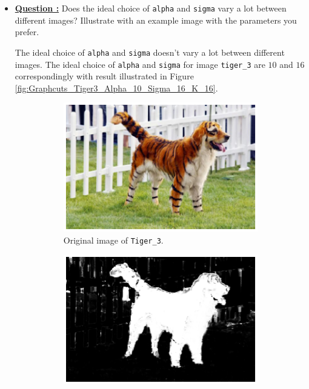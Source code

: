\documentclass[11pt,a4paper]{article}
\begin{document}
\begin{itemize}
	\item\addtocounter{Counter}{1}\underline{\textbf{Question :}} Does the ideal choice of \texttt{alpha} and \texttt{sigma} vary a lot between different images? Illustrate with an example image with the parameters you prefer.
		\par The ideal choice of \texttt{alpha} and \texttt{sigma} doesn't vary a lot between different images. The ideal choice of \texttt{alpha} and \texttt{sigma} for image \texttt{tiger\_3} are $10$ and $16$ correspondingly with result illustrated in Figure \ref{fig:Graphcuts_Tiger3_Alpha_10_Sigma_16_K_16}.
		\begin{figure}[!ht]
			\footnotesize
			\centering 
			\begin{subfigure}[t]{0.49\linewidth} %
			\includegraphics[width=\columnwidth]{Graphcuts0_Tiger3_Alpha_10_Sigma_16_K_16.eps}
			\caption{Original image of \texttt{Tiger\_3}.}
			\label{fig:Graphcuts0_Tiger3_Alpha_10_Sigma_16_K_16}
			\end{subfigure}
			\begin{subfigure}[t]{0.49\linewidth} %
			\includegraphics[width=\columnwidth]{Graphcuts1_Tiger3_Alpha_10_Sigma_16_K_16.eps}

\end{subfigure}
\end{figure}
\end{itemize}
\end{document}
